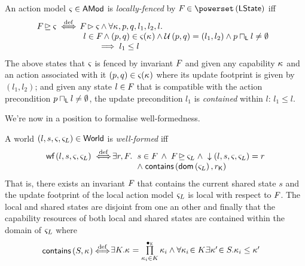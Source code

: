 \begin{definition}
An action model $\varsigma_{} \in \textsf{AMod}$ is \emph{locally-fenced} by $\fence{} \in \pset{\LStates}$ iff
%
\[
\hspace*{-0.2cm}
\begin{array}{l l}
	\fence{} \strictfences \amod{} \iffdef 
	&
		\hspace*{-0.3cm}
		\fence{} \fences \amod{} \land
		\for{\ca{}, p, q, l_1, l_2, l}\\
	&
		\hspace*{-0.15cm}
		l \in \fence{} \land 
		(p, q) \in \amod{}(\ca{}) \land 
		\updateFP{p, q} = (l_1, l_2) \land 
		p \meetL l \not= \emptyset\\
	&
		\hspace*{0.5cm}
		\implies
		l_1 \leq l
\end{array}
\]
%
The above states that $\varsigma_{}$ is fenced by invariant $F_{}$ and given any capability $\kappa_{}$ and an action associated with it $(p, q) \in \varsigma_{}(\kappa_{})$ where its update footprint is given by $(l_1, l_2)$; and given any state $l \in F_{}$ that is compatible with the action precondition $p \sqcap_{\textsf{L}} l \not= \emptyset$, the update precondition $l_1$ is \emph{contained} within $l$: $l_1 \leq l$. 
\end{definition}
%
%
We're now in a position to formalise well-formedness.
%
\begin{definition}
A world $(l, s, \varsigma_{}, \varsigma_{L}) \in \textsf{World}$ is \emph{well-formed} iff
%
\[
\begin{array}{l l l}
	\wf{l, s, \amod{}, \amod{L}} \iffdef 
	\hspace*{-0.2cm} & \hspace*{-0.2cm}
	\exsts{r, \fence{}} 
	\hspace*{-0.1cm} & \hspace*{-0.1cm} 
		s \in \fence{} \;\land\; 
		\fence{} \strictfences \amod{L} \;\land\;
		\collapseW{l, s, \amod{}, \amod{L}} = r\\
	
	\hspace*{-0.2cm} & \hspace*{-0.2cm} 
	& \hspace*{-0.1cm} 	
	\land\; \contains{\dom{\amod{L}}}{\capPart{r}}
\end{array}
\]
%
That is, there exists an invariant $F_{}$ that contains the current shared state $s$ and the update footprint of the local action model $\varsigma_{L}$ is local with respect to $F_{}$. The local and shared states are disjoint from one an other and finally that the capability resources of both local and shared states are contained within the domain of $\varsigma_{L}$ where
%
\[
\hspace*{-0.2cm}
\begin{array}{l l}
	\contains{S}{\ca{}}\!\! \iffdef & \hspace*{-0.6cm}
	\begin{array}{l}
		\exsts{K}\! \ca{} = \prod\limits_{\ca{i} \in K}^{\composeCap} \ca{i} \land
		\for{\ca{i} \!\in K}\!\! \exsts{\ca{}' \!\in S}\! \ca{i} \leq \ca{}'
	\end{array}
\end{array}
\]
%
\end{definition}
%
%
%
%
